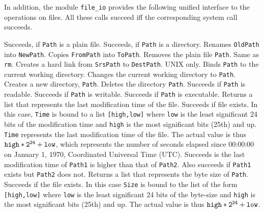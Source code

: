 In addition, the module {\tt file\_io} provides the following unified
interface to the operations on files. All these calls succeed iff the
corresponding system call succeeds.
\begin{description}
  Succeeds, if {\tt Path} is a plain file.
  Succeeds, if {\tt Path} is a directory.
  Renames {\tt OldPath} into {\tt NewPath}.
  Copies {\tt FromPath} into {\tt ToPath}.
  Removes the plain file {\tt Path}.
  Same as {\tt rm}.
  Creates a hard link from {\tt SrsPath} to {\tt DestPath}. UNIX only.
  Binds {\tt Path} to the current working directory.
  Changes the current working directory to {\tt Path}.
  Creates a new directory, {\tt Path}.
  Deletes the directory {\tt Path}.
  Succeeds if {\tt Path} is readable.
  Succeeds if {\tt Path} is writable.
  Succeeds if {\tt Path} is executable.
  Returns a list that represents the last modification time of the file.
  Succeeds if file exists. In this case, {\tt Time} is bound to a list
  {\tt [high,low]} where {\tt low} is the least significant 24 bits of the
  modification time and {\tt high} is the most significant bits (25th) and up.
  {\tt Time} represents the last modification time of the file.
  The actual value is thus $\tt high*2^{24} + low$, which represents the
  number of seconds elapsed since 00:00:00 on
       January 1, 1970, Coordinated Universal Time (UTC).
  Succeeds is the last modification time of {\tt Path1} is higher than that
  of {\tt Path2}. Also succeeds if {\tt Path1} exists but {\tt Path2} does
  not.
  Returns a list that represents the byte size of {\tt Path}.
  Succeeds if the file exists. In this case {\tt Size} is bound to the list
  of the form {\tt [high,low]} where {\tt low} is the least significant 24
  bits of the byte-size and {\tt high} is the most significant bits (25th)
  and up. The actual value is thus $\tt high*2^{24} + low$.
\end{description}



